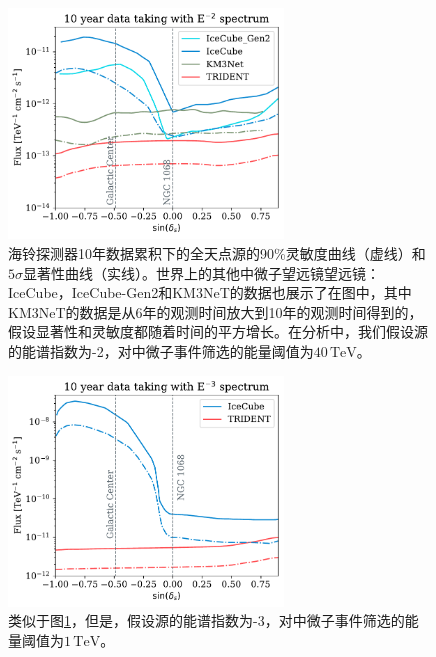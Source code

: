 \begin{figure}[!htb]%
    \centering
    \includegraphics[width=0.65\textwidth]{img/all_sky_sensitivity_E2.pdf}
    \caption{海铃探测器10年数据累积下的全天点源的90\%灵敏度曲线（虚线）和$5\sigma$显著性曲线（实线）。世界上的其他中微子望远镜望远镜：IceCube\cite{IceCube_10yr_point_source:2019}，IceCube-Gen2\cite{IceCube-Gen2_sensitivity:2021}和KM3NeT\cite{KM3NeT_sensitivity:2018}的数据也展示了在图中，其中KM3NeT的数据是从6年的观测时间放大到10年的观测时间得到的，假设显著性和灵敏度都随着时间的平方增长。在分析中，我们假设源的能谱指数为-2，对中微子事件筛选的能量阈值为$40\,\mathrm{TeV}$。}
    \label{fig:all_sky_sensitivity_E2}
\end{figure}

\begin{figure}[!htb]%
    \centering
    \includegraphics[width=0.65\textwidth]{img/all_sky_sensitivity_E3.pdf}
    \caption{类似于图\ref{fig:all_sky_sensitivity_E2}，但是，假设源的能谱指数为-3，对中微子事件筛选的能量阈值为$1\,\mathrm{TeV}$。}
    \label{fig:all_sky_sensitivity_E3}
\end{figure}


